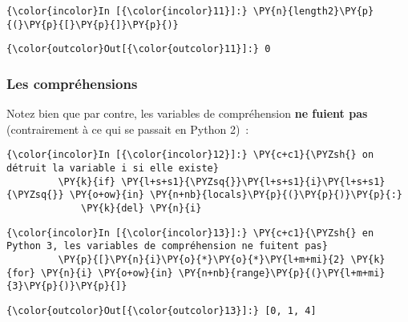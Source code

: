     \begin{Verbatim}[commandchars=\\\{\},frame=single,framerule=0.3mm,rulecolor=\color{cellframecolor}]
{\color{incolor}In [{\color{incolor}11}]:} \PY{n}{length2}\PY{p}{(}\PY{p}{[}\PY{p}{]}\PY{p}{)}
\end{Verbatim}


\begin{Verbatim}[commandchars=\\\{\},frame=single,framerule=0.3mm,rulecolor=\color{cellframecolor}]
{\color{outcolor}Out[{\color{outcolor}11}]:} 0
\end{Verbatim}
            
    \hypertarget{les-compruxe9hensions}{%
\subsubsection{Les compréhensions}\label{les-compruxe9hensions}}

    Notez bien que par contre, les variables de compréhension \textbf{ne
fuient pas} (contrairement à ce qui se passait en Python 2)~:

    \begin{Verbatim}[commandchars=\\\{\},frame=single,framerule=0.3mm,rulecolor=\color{cellframecolor}]
{\color{incolor}In [{\color{incolor}12}]:} \PY{c+c1}{\PYZsh{} on détruit la variable i si elle existe}
         \PY{k}{if} \PY{l+s+s1}{\PYZsq{}}\PY{l+s+s1}{i}\PY{l+s+s1}{\PYZsq{}} \PY{o+ow}{in} \PY{n+nb}{locals}\PY{p}{(}\PY{p}{)}\PY{p}{:} 
             \PY{k}{del} \PY{n}{i}
\end{Verbatim}


    \begin{Verbatim}[commandchars=\\\{\},frame=single,framerule=0.3mm,rulecolor=\color{cellframecolor}]
{\color{incolor}In [{\color{incolor}13}]:} \PY{c+c1}{\PYZsh{} en Python 3, les variables de compréhension ne fuitent pas}
         \PY{p}{[}\PY{n}{i}\PY{o}{*}\PY{o}{*}\PY{l+m+mi}{2} \PY{k}{for} \PY{n}{i} \PY{o+ow}{in} \PY{n+nb}{range}\PY{p}{(}\PY{l+m+mi}{3}\PY{p}{)}\PY{p}{]}
\end{Verbatim}


\begin{Verbatim}[commandchars=\\\{\},frame=single,framerule=0.3mm,rulecolor=\color{cellframecolor}]
{\color{outcolor}Out[{\color{outcolor}13}]:} [0, 1, 4]
\end{Verbatim}
            
